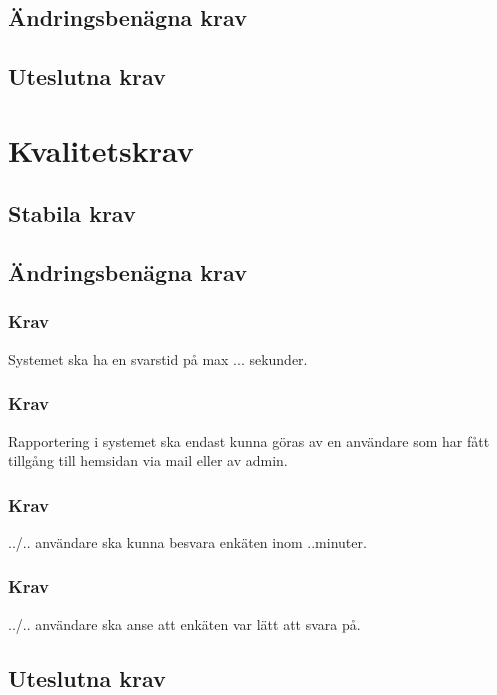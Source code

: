 \documentclass{article}
\begin{document}
    \newpage
    \subsection{Ändringsbenägna krav}
    \subsection{Uteslutna krav}
    
  
   
    \section{Kvalitetskrav}
    \subsection{Stabila krav}
  
     \subsection{Ändringsbenägna krav}
     
     \subsubsection{Krav}
    Systemet ska ha en svarstid på max ... sekunder.
    
    \subsubsection{Krav}
    Rapportering i systemet ska endast kunna göras av en användare som har fått tillgång till hemsidan via mail eller av admin.
    
     \subsubsection{Krav}
    ../.. användare ska kunna besvara enkäten inom ..minuter.
    
    \subsubsection{Krav}
    ../.. användare ska anse att enkäten var lätt att svara på.
    
    \subsection{Uteslutna krav}

\end{document}

